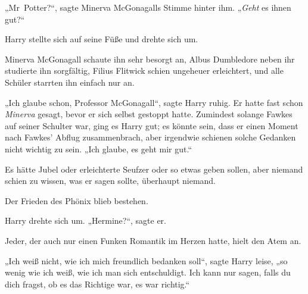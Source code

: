 „Mr~Potter?“, sagte Minerva McGonagalls Stimme hinter ihm.
„\emph{Geht} es ihnen gut?“

Harry stellte sich auf seine Füße und drehte sich um.

Minerva McGonagall schaute ihn sehr besorgt an, Albus Dumbledore neben ihr studierte ihn sorgfältig, Filius Flitwick schien ungeheuer erleichtert, und alle Schüler starrten ihn einfach nur an.

„Ich glaube schon, Professor McGonagall“, sagte Harry ruhig. Er hatte fast schon \emph{Minerva} gesagt, bevor er sich selbst gestoppt hatte. Zumindest solange Fawkes auf seiner Schulter war, ging es Harry gut; es könnte sein, dass er einen Moment nach Fawkes’ Abflug zusammenbrach, aber irgendwie schienen solche Gedanken nicht wichtig zu sein.
„Ich glaube, es geht mir gut.“

Es hätte Jubel oder erleichterte Seufzer oder so etwas geben sollen, aber niemand schien zu wissen, was er sagen sollte, überhaupt niemand.

Der Frieden des Phönix blieb bestehen.

Harry drehte sich um.
„Hermine?“, sagte er.

Jeder, der auch nur einen Funken Romantik im Herzen hatte, hielt den Atem an.

„Ich weiß nicht, wie ich mich freundlich bedanken soll“, sagte Harry leise, „so wenig wie ich weiß, wie ich man sich entschuldigt. Ich kann nur sagen, falls du dich fragst, ob es das Richtige war, es war richtig.“

